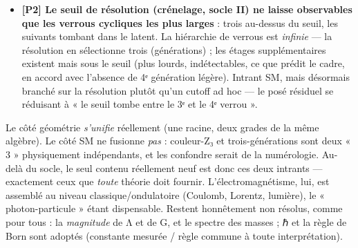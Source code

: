 \documentclass[11pt]{article}
\begin{document}
\begin{itemize}
  il ne \emph{force} pas SU(3) (la tour latente est une hiérarchie
  d'échelles, pas un triplet de directions à symétrie S₃). Plus
  fondamentalement, dériver la couleur d'un triplet de directions est
  interdit par un \emph{théorème} : la couleur commute avec Lorentz
  (théorème de Coleman-Mandula), alors qu'un triplet de directions se
  transforme sous les rotations --- il appartient donc au secteur du
  spin (racine R1), non à la couleur interne. La couleur est ainsi
  \emph{nécessairement} un secteur interne posé (foyer latent, à la
  Kaluza-Klein) : son caractère posé n'est pas un manque, c'est une
  conséquence de théorème.
\item
  \textbf{{[}P2{]} Le seuil de résolution (crénelage, socle II) ne
  laisse observables que les verrous cycliques les plus larges} : trois
  au-dessus du seuil, les suivants tombant dans le latent. La hiérarchie
  de verrous est \emph{infinie} --- la résolution en sélectionne trois
  (générations) ; les étages supplémentaires existent mais sous le seuil
  (plus lourds, indétectables, ce que prédit le cadre, en accord avec
  l'absence de 4ᵉ génération légère). Intrant SM, mais désormais branché
  sur la résolution plutôt qu'un cutoff ad hoc --- le posé résiduel se
  réduisant à « le seuil tombe entre le 3ᵉ et le 4ᵉ verrou ».
\end{itemize}

Le côté géométrie \emph{s'unifie} réellement (une racine, deux grades de
la même algèbre). Le côté SM ne fusionne \emph{pas} : couleur-Z₃ et
trois-générations sont deux « 3 » physiquement indépendants, et les
confondre serait de la numérologie. Au-delà du socle, le seul contenu
réellement neuf est donc ces deux intrants --- exactement ceux que
\emph{toute} théorie doit fournir. L'électromagnétisme, lui, est
assemblé au niveau classique/ondulatoire (Coulomb, Lorentz, lumière), le
« photon-particule » étant dispensable. Restent honnêtement non résolus,
comme pour tous : la \emph{magnitude} de Λ et de G, et le spectre des
masses ; ℏ et la règle de Born sont adoptés (constante mesurée / règle
commune à toute interprétation).
\end{document}
